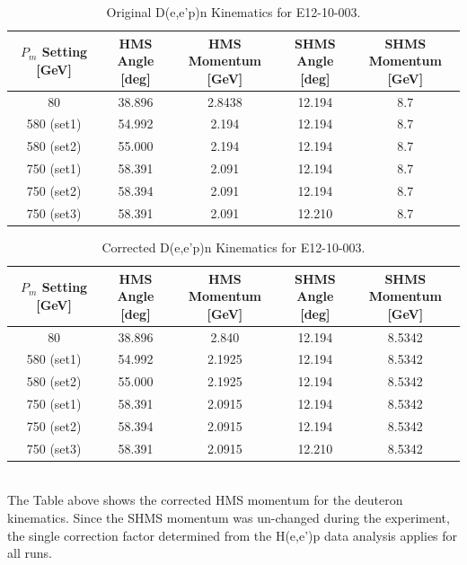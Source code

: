 \documentclass[11pt]{article}
\begin{document}
\begin{table}[ht]
\begin{tabular}{c c c c c}
\hline\hline
\shortstack{$P_{m}$ \\ Setting [GeV]}  & \shortstack{HMS \\ Angle [deg]} & \shortstack{HMS \\ Momentum [GeV]} & \shortstack{SHMS \\ Angle [deg]} & \shortstack{SHMS \\ Momentum [GeV]} \\
\hline
80 & 38.896 & 2.8438 & 12.194 & 8.7 \\
580 (set1) & 54.992 & 2.194 & 12.194 & 8.7 \\
580 (set2) & 55.000 & 2.194 & 12.194 & 8.7 \\
750 (set1) & 58.391 & 2.091 & 12.194 & 8.7 \\
750 (set2) & 58.394 & 2.091 & 12.194 & 8.7 \\
750 (set3) & 58.391 & 2.091 & 12.210 & 8.7 \\
\hline
\end{tabular}
\label{table:original_deep_kin}
\caption{Original D(e,e'p)n Kinematics for E12-10-003.}
\end{table}
\begin{table}[h!]
\begin{tabular}{c c c c c}
\hline\hline
\shortstack{$P_{m}$ \\ Setting [GeV]}  & \shortstack{HMS \\ Angle [deg]} & \shortstack{HMS \\ Momentum [GeV]} & \shortstack{SHMS \\ Angle [deg]} & \shortstack{SHMS \\ Momentum [GeV]} \\
\hline
80 & 38.896 & 2.840 & 12.194 & 8.5342 \\
580 (set1) & 54.992 & 2.1925 & 12.194 & 8.5342 \\
580 (set2) & 55.000 & 2.1925 & 12.194 & 8.5342 \\
750 (set1) & 58.391 & 2.0915 & 12.194 & 8.5342 \\
750 (set2) & 58.394 & 2.0915 & 12.194 & 8.5342 \\
750 (set3) & 58.391 & 2.0915 & 12.210 & 8.5342 \\
\hline
\end{tabular}
\label{tab:corr_deep_kin}
\caption{Corrected D(e,e'p)n Kinematics for E12-10-003.}
\end{table}\\
The Table above shows the corrected HMS momentum for the deuteron kinematics. Since the SHMS momentum was un-changed during the experiment,
the single correction factor determined from the H(e,e')p data analysis applies for all runs. 
\newpage
\onecolumn



\end{document}
